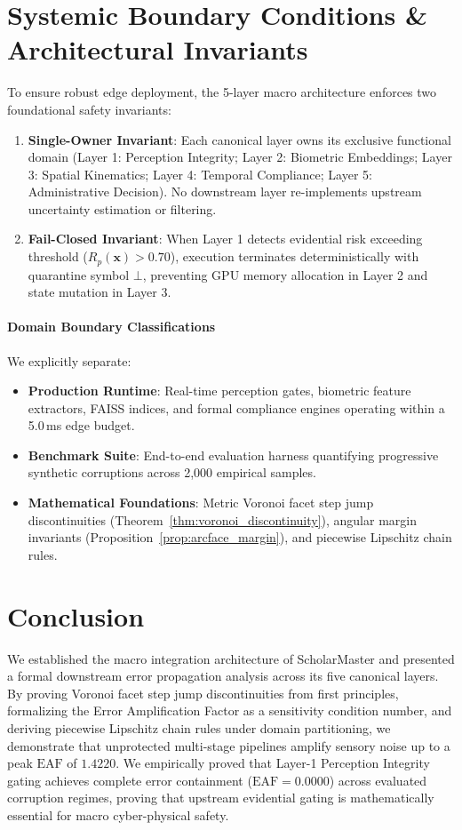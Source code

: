 \documentclass[conference]{IEEEtran}
\begin{document}
\section{Systemic Boundary Conditions \& Architectural Invariants}
To ensure robust edge deployment, the 5-layer macro architecture enforces two foundational safety invariants:
\begin{enumerate}
    \item \textbf{Single-Owner Invariant}: Each canonical layer owns its exclusive functional domain (Layer 1: Perception Integrity; Layer 2: Biometric Embeddings; Layer 3: Spatial Kinematics; Layer 4: Temporal Compliance; Layer 5: Administrative Decision). No downstream layer re-implements upstream uncertainty estimation or filtering.
    \item \textbf{Fail-Closed Invariant}: When Layer 1 detects evidential risk exceeding threshold ($R_p(\mathbf{x}) > 0.70$), execution terminates deterministically with quarantine symbol $\bot$, preventing GPU memory allocation in Layer 2 and state mutation in Layer 3.
\end{enumerate}

\paragraph{Domain Boundary Classifications} We explicitly separate:
\begin{itemize}
    \item \textbf{Production Runtime}: Real-time perception gates, biometric feature extractors, FAISS indices, and formal compliance engines operating within a 5.0\,ms edge budget.
    \item \textbf{Benchmark Suite}: End-to-end evaluation harness quantifying progressive synthetic corruptions across 2,000 empirical samples.
    \item \textbf{Mathematical Foundations}: Metric Voronoi facet step jump discontinuities (Theorem~\ref{thm:voronoi_discontinuity}), angular margin invariants (Proposition~\ref{prop:arcface_margin}), and piecewise Lipschitz chain rules.
\end{itemize}

\section{Conclusion}
We established the macro integration architecture of ScholarMaster and presented a formal downstream error propagation analysis across its five canonical layers. By proving Voronoi facet step jump discontinuities from first principles, formalizing the Error Amplification Factor as a sensitivity condition number, and deriving piecewise Lipschitz chain rules under domain partitioning, we demonstrate that unprotected multi-stage pipelines amplify sensory noise up to a peak $\text{EAF}$ of $1.4220$. We empirically proved that Layer-1 Perception Integrity gating achieves complete error containment ($\text{EAF} = 0.0000$) across evaluated corruption regimes, proving that upstream evidential gating is mathematically essential for macro cyber-physical safety.
\end{document}
